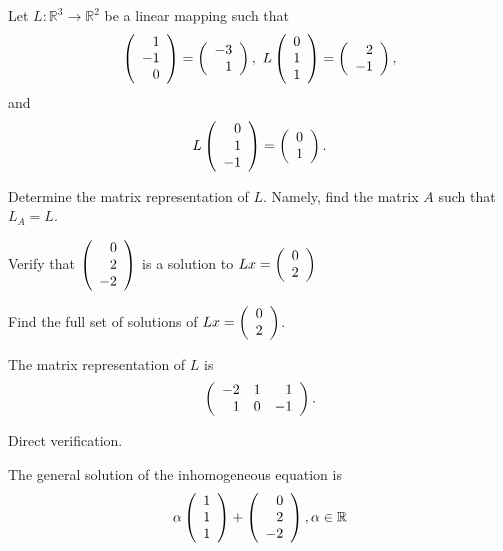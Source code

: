 \documentclass{ximera}
\begin{document}
\begin{exercise} \label{YZ_3.4.7}
Let $L:\mathbb R^3\to \mathbb R^2$ be a linear mapping such that 
\[
\Matrix{1\\-1\\0}=\Matrix{-3\\1},~L\Matrix{0\\1\\1 }=\Matrix{2\\-1},
\]
and 
\[
L\Matrix{ 0\\1\\-1}=\Matrix{0\\1}.
\]


\begin{enumeratea}
\item Determine the matrix representation of $L$. Namely, find the matrix $A$ such that $L_A=L$.

\item Verify that  $\Matrix{0\\2\\-2}$ is a solution to $Lx=\Matrix{0\\2}$
\item Find the full set of solutions of $Lx=\Matrix{0\\2}$.
\end{enumeratea}


\begin{solution}

\ans 
\begin{enumeratea}
\item  The matrix representation of $L$ is 
 \[
\Matrix{ -2&1&1\\1&0&-1}.
\]

\item Direct verification.
\item The general solution of the inhomogeneous equation is 
\[
\alpha \Matrix{1\\1\\1}+\Matrix{0\\2\\-2}, \alpha\in \mathbb R
\]

\end{enumeratea}



\soln 


\end{solution}
\end{exercise}
\end{document}
